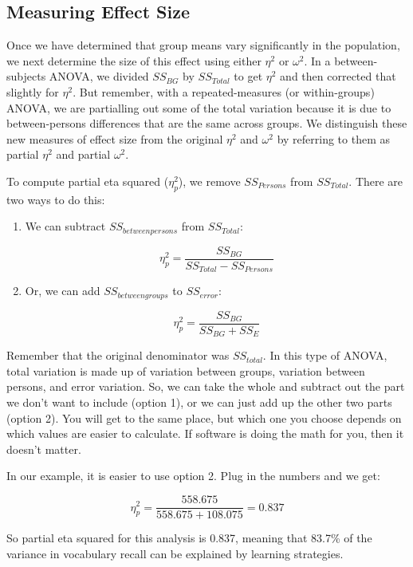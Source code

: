 \documentclass[
  letterpaper,
  DIV=11,
  numbers=noendperiod]{scrreprt}
\begin{document}
\subsection{Measuring Effect Size}\label{measuring-effect-size}

Once we have determined that group means vary significantly in the
population, we next determine the size of this effect using either
\(\eta^2\) or \(\omega^2\). In a between-subjects ANOVA, we divided
\(SS_{BG}\) by \(SS_{Total}\) to get \(\eta^2\) and then corrected that
slightly for \(\eta^2\). But remember, with a repeated-measures (or
within-groups) ANOVA, we are partialling out some of the total variation
because it is due to between-persons differences that are the same
across groups. We distinguish these new measures of effect size from the
original \(\eta^2\) and \(\omega^2\) by referring to them as partial
\(\eta^2\) and partial \(\omega^2\).

To compute partial eta squared (\(\eta^2_p\)), we remove
\(SS_{Persons}\) from \(SS_{Total}\). There are two ways to do this:

\begin{enumerate}
\def\labelenumi{\arabic{enumi}.}
\item
  We can subtract \(SS_{between persons}\) from \(SS_{Total}\):

  \[
   \eta^2_p = \frac{SS_{BG}}{SS_{Total}-SS_{Persons}}
   \]
\item
  Or, we can add \(SS_{between groups}\) to \(SS_{error}\):

  \[
  \eta^2_p = \frac{SS_{BG}}{SS_{BG}+SS_E}
  \]
\end{enumerate}

Remember that the original denominator was \(SS_{total}\). In this type
of ANOVA, total variation is made up of variation between groups,
variation between persons, and error variation. So, we can take the
whole and subtract out the part we don't want to include (option 1), or
we can just add up the other two parts (option 2). You will get to the
same place, but which one you choose depends on which values are easier
to calculate. If software is doing the math for you, then it doesn't
matter.

In our example, it is easier to use option 2. Plug in the numbers and we
get:

\[
\eta_p^2 = \frac{558.675}{558.675 + 108.075} = 0.837
\]

So partial eta squared for this analysis is 0.837, meaning that 83.7\%
of the variance in vocabulary recall can be explained by learning
strategies.
\end{document}
